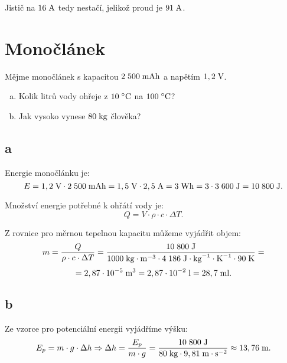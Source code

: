 \documentclass{article}
\begin{document}
Jistič na $16 \; \textrm{A}$ tedy nestačí, jelikož proud je $91 \; \textrm{A}$.

\newpage



\section{ Monočlánek \spicy}
Mějme monočlánek s kapacitou $2 \; 500 \; \textrm{mAh}$ a napětím $1,2 \; \textrm{V}$.

\begin{enumerate}[a)]
    \item Kolik litrů vody ohřeje z $10 \; ^\circ \textrm{C}$ na $100 \; ^\circ \textrm{C}$?
    \item Jak vysoko vynese $80 \; \textrm{kg}$ člověka?
\end{enumerate}


\subsection{a}
Energie monočlánku je:
$$
    E = 1,2 \; \textrm{V} \cdot 2 \; 500 \; \textrm{mAh} = 1,5 \; \textrm{V} \cdot 2,5 \; \textrm{A} = 3 \; \textrm{Wh} = 3 \cdot 3 \; 600 \; \textrm{J} = 10 \; 800 \; \textrm{J}.
$$

Množství energie potřebné k ohřátí vody je:
$$
    Q = V \cdot \rho \cdot c \cdot \Delta T.
$$

Z rovnice pro měrnou tepelnou kapacitu můžeme vyjádřit objem:
$$
    m = \frac{Q}{\rho \cdot c \cdot \Delta T} = \frac{10 \; 800 \; \textrm{J}}{1 000 \; \textrm{kg} \cdot \textrm{m}^{-3} \cdot 4 \; 186 \; \textrm{J} \cdot \textrm{kg}^{-1} \cdot \textrm{K}^{-1} \cdot 90 \; \textrm{K}} =
$$
$$
    = 2,87 \cdot 10^{-5} \; \textrm{m}^{\textrm{3}} = 2,87 \cdot 10^{-2} \; \textrm{l} = 28,7 \; \textrm{ml}.
$$


\subsection{b}
Ze vzorce pro potenciální energii vyjádříme výšku:
$$
    E_p = m \cdot g \cdot \Delta h \Rightarrow \Delta h = \frac{E_p}{m \cdot g} = \frac{10 \; 800 \; \textrm{J}}{80 \; \textrm{kg} \cdot 9,81 \; \textrm{m} \cdot \textrm{s}^{-2}} \approx 13,76 \; \textrm{m}.
$$
\end{document}
